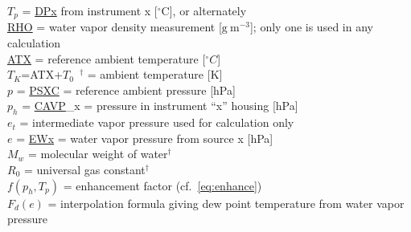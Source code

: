 \documentclass[
]{book}
\begin{document}
\(T_{p}\) = \protect\hyperlink{dew-point}{DPx} from instrument x {[}\(^{\circ}\)C{]}, or alternately\\
\protect\hyperlink{rho}{RHO} = water vapor density measurement
{[}\(\mathrm{g\ }\mathrm{m}^{-3}\){]}; only one is used in any calculation\\
\protect\hyperlink{ambient-t}{ATX} = reference ambient temperature {[}\(^{\circ}C\){]}\\
\(T_{K}\)=ATX+\(T_{0}\)~\(^{\dagger}\) = ambient temperature {[}K{]}\\
\(p\) = \protect\hyperlink{psx}{PSXC} = reference ambient pressure {[}hPa{]}\\
\(p_{h}\) = \protect\hyperlink{p-special}{CAVP}\_x = pressure in instrument ``x'' housing {[}hPa{]}\\
\(e_{t}\) = intermediate vapor pressure used for calculation only\\
\(e\) = \protect\hyperlink{ewx}{EWx} = water vapor pressure from source x {[}hPa{]}\\
\(M_{w}\) = molecular weight of water\(^{\dagger}\)\\
\(R_{0}\) = universal gas constant\(^{\dagger}\)\\
\(f(p_{h},T_{p})\) = enhancement factor (cf.~\eqref{eq:enhance})\\
\(F_{d}(e)\) = interpolation formula giving dew point temperature from water vapor pressure
\end{document}
